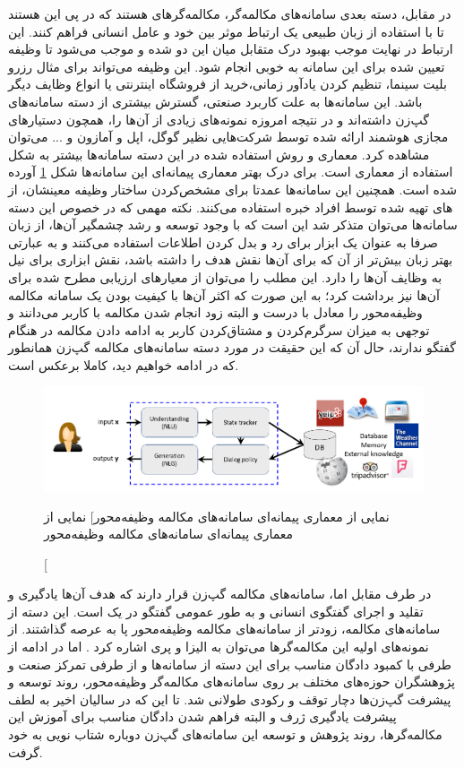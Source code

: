 در مقابل، دسته بعدی سامانه‌های مکالمه‌گر،‌ مکالمه‌گر‌های 
 هستند که در پی این هستند تا با استفاده از زبان طبیعی یک ارتباط موثر بین خود و عامل انسانی فراهم کنند. این ارتباط در نهایت موجب بهبود درک متقابل میان این دو شده و موجب می‌شود تا وظیفه تعیین شده
برای این سامانه به خوبی انجام شود.
این وظیفه می‌تواند برای مثال رزرو بلیت سینما، تنظیم کردن یاد‌آور زمانی،‌خرید از فروشگاه اینترنتی یا انواع وظایف دیگر باشد.
این سامانه‌ها به علت کاربرد صنعتی، گسترش بیشتری از دسته سامانه‌های گپ‌زن داشته‌اند و در نتیجه امروزه نمونه‌های زیادی از آن‌‌ها را، همچون دستیارهای مجازی هوشمند ارائه شده توسط شرکت‌هایی نظیر گوگل، اپل	 و آمازون و ... می‌توان مشاهده کرد. معماری و روش استفاده شده در این دسته سامانه‌ها بیشتر به شکل استفاده از معماری 
است. 
برای درک بهتر معماری پیمانه‌ای این سامانه‌ها شکل 
\ref{fig:chap1s:modular}
آورده شده است.
همچنین این سامانه‌ها عمدتا برای مشخص‌کردن ساختار وظیفه معینشان، از 
 های تهیه شده توسط افراد خبره استفاده می‌کنند.
نکته مهمی که در خصوص این دسته‌ سامانه‌ها می‌توان متذکر شد این است که با وجود توسعه و رشد چشمگیر آن‌ها، از زبان صرفا به عنوان یک ابزار برای رد و بدل کردن اطلاعات استفاده می‌کنند و به عبارتی بهتر زبان بیش‌تر از آن‌ که برای آن‌ها نقش هدف را داشته باشد، نقش ابزاری برای نیل به وظایف آن‌ها را دارد. این مطلب را می‌توان از معیارهای ارزیابی مطرح شده برای آن‌ها نیز برداشت کرد؛ به این صورت که اکثر آن‌ها با کیفیت بودن یک سامانه مکالمه وظیفه‌محور را معادل با درست و البته زود انجام شدن مکالمه با کاربر می‌دانند و توجهی به میزان سرگرم‌کردن و مشتاق‌کردن کاربر به ادامه دادن مکالمه در هنگام گفتگو ندارند، حال آن که این حقیقت در مورد دسته‌ سامانه‌های مکالمه گپ‌زن همانطور که در ادامه خواهیم دید، کاملا برعکس است.

\begin{figure}[h]
	\centering
	\includegraphics[width=1\textwidth]{images/chap1/modular.png}
	\caption
	[نمایی از معماری پیمانه‌ای سامانه‌های مکالمه وظیفه‌محور]
	{
		نمایی از معماری‌ پیمانه‌ای سامانه‌های مکالمه وظیفه‌محور
		\cite{Gao_Neural_Approaches}
	}
	\label{fig:chap1s:modular}
\end{figure}


در طرف مقابل اما، سامانه‌های مکالمه گپ‌زن قرار دارند که هدف آن‌ها یادگیری و تقلید و اجرای گفتگوی انسانی و به طور عمومی گفتگو در یک
است.
این دسته از سامانه‌های مکالمه، زودتر از سامانه‌های مکالمه وظیفه‌محور پا به عرصه گذاشتند.
از نمونه‌های اولیه این مکالمه‌گر‌ها می‌توان به الیزا و پری اشاره کرد
\cite{weizenbaum1966eliza, parry}
.
اما در ادامه از طرفی با کمبود دادگان مناسب برای این دسته از سامانه‌ها و از طرفی تمرکز صنعت و پژوهشگران حوزه‌های مختلف بر روی سامانه‌های مکالمه‌گر وظیفه‌محور، روند توسعه و پیشرفت گپ‌زن‌ها دچار توقف و رکودی طولانی شد. تا این که در سالیان اخیر به لطف پیشرفت یادگیری ژرف و البته فراهم‌ شدن دادگان مناسب برای آموزش این مکالمه‌گر‌ها، روند پژوهش و توسعه این سامانه‌های گپ‌زن دوباره شتاب نویی به خود گرفت.

